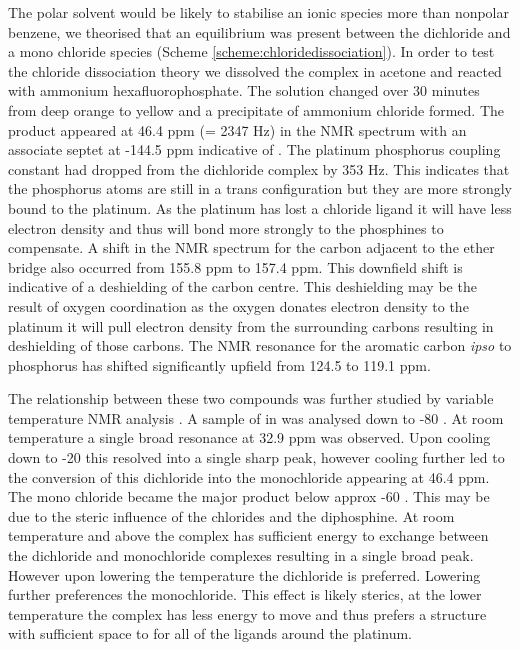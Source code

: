 The polar solvent would be likely to stabilise an ionic species more than nonpolar benzene, we theorised that an equilibrium was present between the dichloride and a mono chloride species (Scheme \ref{scheme:chloridedissociation}).  In order to test the chloride dissociation theory we dissolved the complex in acetone and reacted with ammonium hexafluorophosphate.  The solution changed over 30 minutes from deep orange to yellow and a precipitate of ammonium chloride formed.  The product appeared at 46.4 ppm (\JPtP = 2347 Hz) in the \phosphorus{} NMR spectrum with an associate septet at -144.5 ppm indicative of .  The platinum phosphorus coupling constant had dropped from the dichloride complex by 353 Hz.  This indicates that the phosphorus atoms are still in a trans configuration but they are more strongly bound to the platinum.  As the platinum has lost a chloride ligand it will have less electron density and thus will bond more strongly to the phosphines to compensate.  A shift in the \carbon{} NMR spectrum for the carbon adjacent to the ether bridge also occurred from 155.8 ppm to 157.4 ppm.  This downfield  shift is indicative of a deshielding of the carbon centre.  This deshielding may be the result of oxygen coordination as the oxygen donates electron density to the platinum it will pull electron density from the surrounding carbons resulting in deshielding of those carbons.  The \carbon{} NMR resonance for the aromatic carbon \emph{ipso} to phosphorus has shifted significantly upfield from 124.5 to 119.1 ppm.

The relationship between these two compounds was further studied by variable temperature \phosphorus NMR analysis .  A sample of  in  was analysed down to -80 \degC.  At room temperature a single broad resonance at 32.9 ppm was observed.  Upon cooling down to -20 \degC this resolved into a single sharp peak, however cooling further led to the conversion of this dichloride into the monochloride appearing at 46.4 ppm.  The mono chloride became the major product below approx -60 \degC.  This may be due to the steric influence of the chlorides and the diphosphine.  At room temperature and above the complex has sufficient energy to exchange between the dichloride and monochloride complexes resulting in a single broad peak.  However upon lowering the temperature the dichloride is preferred.  Lowering further preferences the monochloride.  This effect is likely sterics, at the lower temperature the complex has less energy to move and thus prefers a structure with sufficient space to for all of the ligands around the platinum.   

